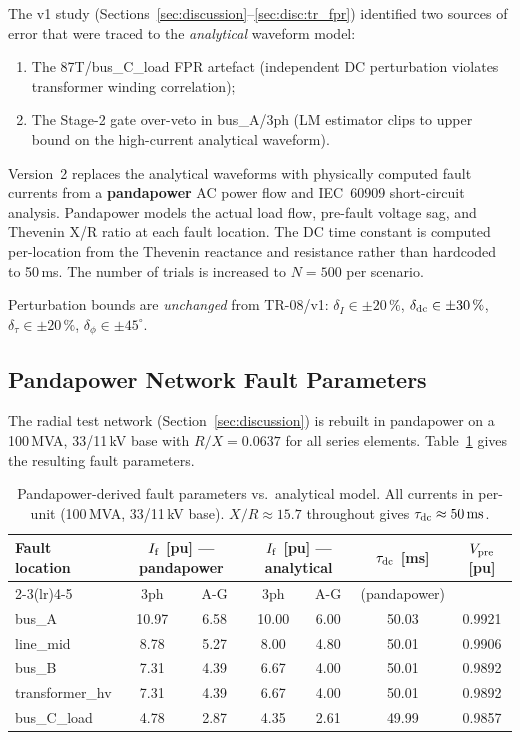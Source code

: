 \documentclass[12pt,a4paper]{article}
\begin{document}
The v1 study (Sections~\ref{sec:discussion}–\ref{sec:disc:tr_fpr})
identified two sources of error that were traced to the \emph{analytical}
waveform model:
\begin{enumerate}[noitemsep]
  \item The 87T/bus\_C\_load FPR artefact (independent DC perturbation
    violates transformer winding correlation);
  \item The Stage-2 gate over-veto in bus\_A/3ph (LM estimator clips to
    upper bound on the high-current analytical waveform).
\end{enumerate}

Version~2 replaces the analytical waveforms with physically computed fault
currents from a \textbf{pandapower} \citep{pandapower} AC power flow and
IEC~60909 short-circuit analysis.  Pandapower models the actual load flow,
pre-fault voltage sag, and Thevenin X/R ratio at each fault location.  The
DC time constant is computed per-location from the Thevenin reactance and
resistance rather than hardcoded to 50\,ms.  The number of trials is
increased to $N=500$ per scenario.

Perturbation bounds are \emph{unchanged} from TR-08/v1:
$\delta_I \in \pm20\,\%$, $\delta_{\rm dc} \in \pm30\,\%$,
$\delta_\tau \in \pm20\,\%$, $\delta_\phi \in \pm45^\circ$.

\subsection{Pandapower Network Fault Parameters}

The radial test network (Section~\ref{sec:discussion}) is rebuilt in
pandapower on a 100\,MVA, 33/11\,kV base with
$R/X = 0.0637$ for all series elements.
Table~\ref{tab:pp_params} gives the resulting fault parameters.

\begin{table}[ht]
\centering
\caption{Pandapower-derived fault parameters vs.\ analytical model.
  All currents in per-unit (100\,MVA, 33/11\,kV base).
  $X/R \approx 15.7$ throughout gives $\tau_{\rm dc} \approx 50\,\text{ms}$.}
\label{tab:pp_params}
\small
\begin{tabular}{lcccccc}
\toprule
Fault location
  & \multicolumn{2}{c}{$I_{\rm f}$ [pu] — pandapower}
  & \multicolumn{2}{c}{$I_{\rm f}$ [pu] — analytical}
  & $\tau_{\rm dc}$ [ms]
  & $V_{\rm pre}$ [pu] \\
\cmidrule(lr){2-3}\cmidrule(lr){4-5}
  & 3ph & A-G & 3ph & A-G & (pandapower) & \\
\midrule
bus\_A          & 10.97 & 6.58 & 10.00 & 6.00 & 50.03 & 0.9921 \\
line\_mid       &  8.78 & 5.27 &  8.00 & 4.80 & 50.01 & 0.9906 \\
bus\_B          &  7.31 & 4.39 &  6.67 & 4.00 & 50.01 & 0.9892 \\
transformer\_hv &  7.31 & 4.39 &  6.67 & 4.00 & 50.01 & 0.9892 \\
bus\_C\_load    &  4.78 & 2.87 &  4.35 & 2.61 & 49.99 & 0.9857 \\
\bottomrule
\end{tabular}
\end{table}
\end{document}
